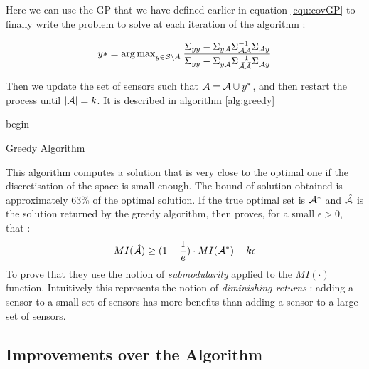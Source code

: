 \documentclass[12pt,twoside]{report}
\begin{document}
Here we can use the GP that we have defined earlier in equation \ref{equ:covGP} to finally write the problem to solve at each iteration of the algorithm : 

\begin{equation}
	y*  = {\arg \max}_{y \in \mathcal{S} \backslash A } \: \frac{\Sigma_{yy} - \Sigma_{y\mathcal{A}} \Sigma_{\mathcal{A}\mathcal{A}}^{-1} \Sigma_{\mathcal{A} y} }{\Sigma_{yy} - \Sigma_{y\bar{\mathcal{A}}} \Sigma_{\bar{\mathcal{A}}\bar{\mathcal{A}}}^{-1} \Sigma_{\bar{\mathcal{A}} y} } \label{equ:updateGreedy}
\end{equation}

Then we update the set of sensors such that $\mathcal{A} = \mathcal{A} \cup y^*$, and then restart the process until $|\mathcal{A}| = k$. It is described in algorithm \ref{alg:greedy}  \\

\begin{algorithm}[h]
 begin\;
 \caption{Greedy Algorithm}
 \label{alg:greedy}
\end{algorithm}


This algorithm computes a solution that is very close to the optimal one if the discretisation of the space is small enough. The bound of solution obtained is approximately 63\% of the optimal solution. If the true optimal set is $\mathcal{A}^*$ and $\hat{\mathcal{A}}$ is the solution returned by the greedy algorithm, then \citet{krause_near-optimal_2008} proves, for a small $\epsilon >0 $, that : 
 \begin{equation}
	MI(\hat{\mathcal{A}}) \geq (1 - \frac{1}{e}) \cdot MI(\mathcal{A}^*) - k\epsilon
\end{equation}
To prove that they use the notion of \textit{submodularity} \citep{nemhauser_analysis_1978} applied to the $MI(\cdot)$ function. Intuitively this represents the notion of \textit{diminishing returns} :  adding a sensor to a small set of sensors has more benefits than adding a sensor to a large set of sensors. 


\subsection{Improvements over the Algorithm}
\end{document}
